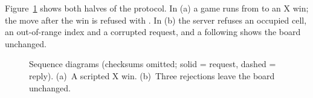 Figure~\ref{fig:sequence} shows both halves of the protocol. In (a) a game runs from  to an X win; the
move after the win is refused with . In (b) the server refuses an occupied cell, an out-of-range index and
a corrupted request, and a following  shows the board unchanged.

\begin{figure}[t]
\centering

\caption{Sequence diagrams (checksums omitted; solid = request, dashed = reply). (a)~A scripted X win. (b)~Three rejections leave the board unchanged.}
\label{fig:sequence}
\end{figure}

